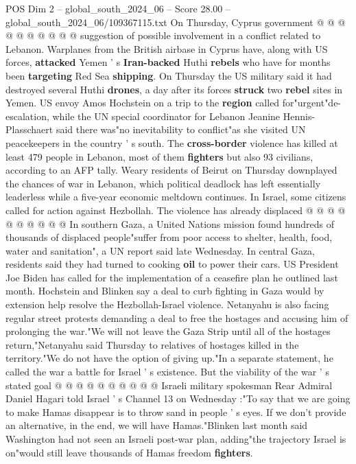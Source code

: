 \begin{textsample}{POS Dim 2 – global\_south\_2024\_06 – Score 28.00 – global\_south\_2024\_06/109367115.txt}
On Thursday, Cyprus government @ @ @ @ @ @ @ @ @ @ suggestion of possible involvement in a conflict related to Lebanon.
Warplanes from the British airbase in Cyprus have, along with US forces, \textbf{attacked} Yemen ' s \textbf{Iran-backed} Huthi \textbf{rebels} who have for months been \textbf{targeting} Red Sea \textbf{shipping}.
On Thursday the US military said it had destroyed several Huthi \textbf{drones}, a day after its forces \textbf{struck} two \textbf{rebel} sites in Yemen.
US envoy Amos Hochstein on a trip to the \textbf{region} called for"urgent"de-escalation, while the UN special coordinator for Lebanon Jeanine Hennis-Plasschaert said there was"no inevitability to conflict"as she visited UN peacekeepers in the country ' s south.
The \textbf{cross-border} violence has killed at least 479 people in Lebanon, most of them \textbf{fighters} but also 93 civilians, according to an AFP tally.
Weary residents of Beirut on Thursday downplayed the chances of war in Lebanon, which political deadlock has left essentially leaderless while a five-year economic meltdown continues.
In Israel, some citizens called for action against Hezbollah.
The violence has already displaced @ @ @ @ @ @ @ @ @ @ In southern Gaza, a United Nations mission found hundreds of thousands of displaced people"suffer from poor access to shelter, health, food, water and sanitation", a UN report said late Wednesday.
In central Gaza, residents said they had turned to cooking \textbf{oil} to power their cars.
US President Joe Biden has called for the implementation of a ceasefire plan he outlined last month.
Hochstein and Blinken say a deal to curb fighting in Gaza would by extension help resolve the Hezbollah-Israel violence.
Netanyahu is also facing regular street protests demanding a deal to free the hostages and accusing him of prolonging the war."We will not leave the Gaza Strip until all of the hostages return,"Netanyahu said Thursday to relatives of hostages killed in the territory."We do not have the option of giving up."In a separate statement, he called the war a battle for Israel ' s existence.
But the viability of the war ' s stated goal @ @ @ @ @ @ @ @ @ @ Israeli military spokesman Rear Admiral Daniel Hagari told Israel ' s Channel 13 on Wednesday :"To say that we are going to make Hamas disappear is to throw sand in people ' s eyes.
If we don't provide an alternative, in the end, we will have Hamas."Blinken last month said Washington had not seen an Israeli post-war plan, adding"the trajectory Israel is on"would still leave thousands of Hamas freedom \textbf{fighters}.

\end{textsample}
